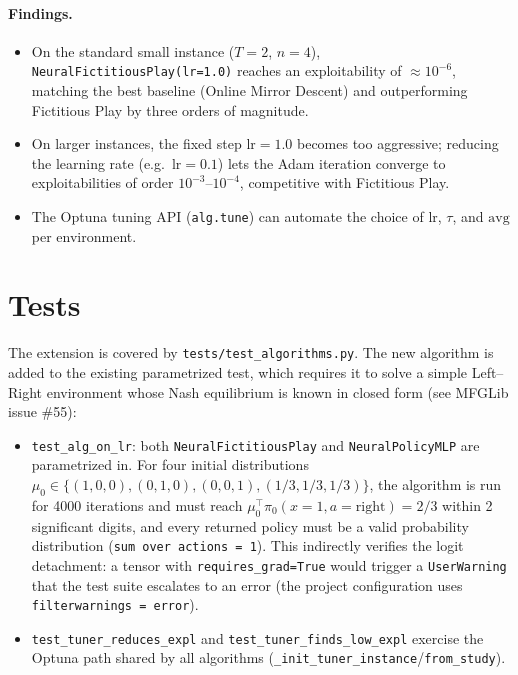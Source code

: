 \documentclass[11pt,a4paper]{article}
\begin{document}
\paragraph{Findings.}
\begin{itemize}
  \item On the standard small instance ($T{=}2$, $n{=}4$),
        \texttt{NeuralFictitiousPlay(lr=1.0)} reaches an exploitability of
        $\approx 10^{-6}$, matching the best baseline
        (Online Mirror Descent) and outperforming Fictitious Play by three
        orders of magnitude.
  \item On larger instances, the fixed step $\mathrm{lr}=1.0$ becomes too
        aggressive; reducing the learning rate (e.g.\ $\mathrm{lr}=0.1$) lets
        the Adam iteration converge to exploitabilities of order
        $10^{-3}$--$10^{-4}$, competitive with Fictitious Play.
  \item The Optuna tuning API (\texttt{alg.tune}) can automate the choice of
        $\mathrm{lr}$, $\tau$, and $\mathrm{avg}$ per environment.
\end{itemize}

\section{Tests}\label{sec:tests}

The extension is covered by \texttt{tests/test\_algorithms.py}. The new
algorithm is added to the existing parametrized test, which requires it to
solve a simple Left--Right environment whose Nash equilibrium is known in
closed form (see MFGLib issue \#55):
\begin{itemize}
  \item \texttt{test\_alg\_on\_lr}: both \texttt{NeuralFictitiousPlay} and
  \texttt{NeuralPolicyMLP} are parametrized in. For four initial distributions
        $\mu_0 \in \{(1,0,0), (0,1,0), (0,0,1), (1/3,1/3,1/3)\}$, the
        algorithm is run for 4000 iterations and must reach
        $\mu_0^\top \pi_{0}(x{=}1, a{=}\text{right}) = 2/3$
        within 2 significant digits, and every returned policy must be a valid
        probability distribution (\texttt{sum over actions = 1}). This
        indirectly verifies the logit detachment: a tensor with
        \texttt{requires\_grad=True} would trigger a \texttt{UserWarning}
        that the test suite escalates to an error (the project configuration
        uses \texttt{filterwarnings = error}).
  \item \texttt{test\_tuner\_reduces\_expl} and \texttt{test\_tuner\_finds\_low\_expl}
        exercise the Optuna path shared by all algorithms
        (\texttt{\_init\_tuner\_instance}/\texttt{from\_study}).
\end{itemize}
\end{document}
